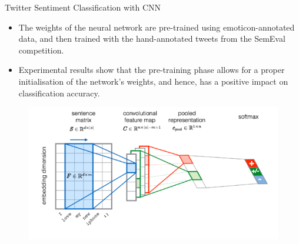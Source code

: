 \begin{frame}{Twitter Sentiment Classification with CNN}
\begin{scriptsize}
\begin{itemize}
\item  The weights of the neural network are pre-trained using emoticon-annotated data, and then trained with the hand-annotated tweets from the SemEval competition.
\item   Experimental results show that the pre-training phase allows for a proper initialisation of the network's weights, and hence, has a positive impact on classification accuracy. 
\end{itemize}
  \begin{figure}[h]
        	\includegraphics[scale = 0.45]{pics/cnn-twitter.png}
        \end{figure}
\end{scriptsize}
\end{frame}




